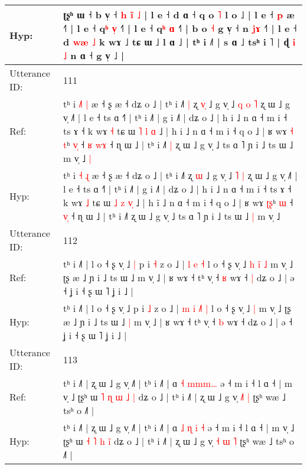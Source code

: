 \documentclass[10pt]{article}
\DeclareRobustCommand{\hl}[1]{{\textcolor{red}{#1}}}
\begin{document}
\begin{longtable}{ll}
 \\
Hyp: & ʈʂʰ ɯ ˧ b v̩ ˧\hl{ }\hl{h} \hl{i}\hl{̃} \hl{˩} | l e ˧ d ɑ ˧\hl{}\hl{}\hl{} q o \hl{˥} l o ˩ | l e ˧ \hl{p} \hl{}æ ˧˥ | l e ˧ q\hl{ʰ} \hl{v}\hl{̩} ˧˥ | l e ˧ q\hl{ʰ}\hl{ }\hl{ɑ} ˧˥ | b o \hl{˧} g v̩ ˧ n \hl{j}\hl{ɤ} ˧˥ | l e ˧ d\hl{}\hl{} \hl{w}\hl{æ} \hl{˩} k wɤ ˩ tɕ ɯ ˩ l ɑ ˩ | tʰ i ˩˥ | s ɑ ˩ tsʰ i \hl{}˥ | ɖ \hl{i} \hl{˩} n ɑ ˧ g v̩ ˩ |
 \\
\midrule
Utterance ID: & 111 \\
Ref: & tʰ i \hl{˩}\hl{˥} \hl{|} æ ˧ ʂ æ ˧ dʑ o ˩ | tʰ i ˩˥\hl{ }\hl{|} ʐ \hl{v}\hl{̩} ˩ g v̩ ˩\hl{ }\hl{q} \hl{o} \hl{˥} ʐ ɯ ˩ g v̩ ˩˥ | l e ˧ ts ɑ ˧˥ | tʰ i ˩˥ | g i ˩˥ | dʑ o ˩ | h i ˩ n ɑ ˧ m i ˧ ts ɤ ˧ k wɤ \hl{˧} tɕ ɯ \hl{˥} \hl{l} \hl{}\hl{ɑ} ˩ | h i\hl{} ˩ n ɑ ˧ m i ˧ q o ˩ | ʁ wɤ \hl{˧}\hl{ }\hl{t}ʰ \hl{v}\hl{̩} ˧\hl{ }\hl{ʁ} \hl{w}\hl{ɤ} ˧ ɳ ɯ ˩ | tʰ i ˩˥\hl{ }\hl{|} ʐ ɯ ˩ g v̩ ˩ ts ɑ ˥ ɲ i ˩ ts ɯ ˩\hl{}\hl{} m v̩ ˩\hl{ }\hl{|}
 \\
Hyp: & tʰ i \hl{}\hl{˧} \hl{ɻ} æ ˧ ʂ æ ˧ dʑ o ˩ | tʰ i ˩˥\hl{}\hl{} ʐ \hl{}\hl{ɯ} ˩ g v̩ ˩\hl{}\hl{} \hl{˥} \hl{|} ʐ ɯ ˩ g v̩ ˩˥ | l e ˧ ts ɑ ˧˥ | tʰ i ˩˥ | g i ˩˥ | dʑ o ˩ | h i ˩ n ɑ ˧ m i ˧ ts ɤ ˧ k wɤ \hl{˩} tɕ ɯ \hl{˩} \hl{z} \hl{v}\hl{̩} ˩ | h i\hl{̃} ˩ n ɑ ˧ m i ˧ q o ˩ | ʁ wɤ \hl{}\hl{ʈ}\hl{ʂ}ʰ \hl{}\hl{ɯ} ˧\hl{}\hl{} \hl{v}\hl{̩} ˧ ɳ ɯ ˩ | tʰ i ˩˥\hl{}\hl{} ʐ ɯ ˩ g v̩ ˩ ts ɑ ˥ ɲ i ˩ ts ɯ ˩\hl{ }\hl{|} m v̩ ˩\hl{}\hl{}
 \\
\midrule
Utterance ID: & 112 \\
Ref: & tʰ i ˩˥ | l o ˧ ʂ v̩ ˩\hl{ }\hl{|} p i \hl{˧} z o ˩ |\hl{}\hl{} \hl{l} \hl{}\hl{e} \hl{˧} l o ˧ ʂ v̩ ˩\hl{ }\hl{h}\hl{ }\hl{i}\hl{̃} \hl{˩} m v̩ ˩ ʈʂ æ ˩ ɲ i ˩ ts ɯ ˩\hl{}\hl{} m v̩ ˩ | ʁ wɤ ˧ tʰ v̩ ˧ \hl{ʁ} wɤ ˧\hl{ }\hl{|} dʑ o ˩ | ə ˧ ʝ i ˧ ʂ ɯ ˥ ʝ i ˩ |
 \\
Hyp: & tʰ i ˩˥ | l o ˧ ʂ v̩ ˩\hl{}\hl{} p i \hl{˩} z o ˩ |\hl{ }\hl{m} \hl{i} \hl{˩}\hl{˥} \hl{|} l o ˧ ʂ v̩ ˩\hl{}\hl{}\hl{}\hl{}\hl{} \hl{|} m v̩ ˩ ʈʂ æ ˩ ɲ i ˩ ts ɯ ˩\hl{ }\hl{|} m v̩ ˩ | ʁ wɤ ˧ tʰ v̩ ˧ \hl{b} wɤ ˧\hl{}\hl{} dʑ o ˩ | ə ˧ ʝ i ˧ ʂ ɯ ˥ ʝ i ˩ |
 \\
\midrule
Utterance ID: & 113 \\
Ref: & tʰ i ˩˥ | ʐ ɯ ˩ g v̩ ˩˥ | tʰ i ˩˥ | ɑ \hl{˧} \hl{}\hl{m}\hl{m}\hl{m}\hl{…} ə ˧ m i ˧ l ɑ ˧ | m v̩ ˩ ʈʂʰ ɯ \hl{˥} \hl{ɳ} \hl{ɯ} \hl{˩}\hl{ }\hl{|} dʑ o ˩ | tʰ i ˩˥ | ʐ ɯ ˩ g v̩ \hl{}\hl{˩}\hl{˥} \hl{|} ʈʂʰ wæ ˩ tsʰ o ˩˥ |
 \\
Hyp: & tʰ i ˩˥ | ʐ ɯ ˩ g v̩ ˩˥ | tʰ i ˩˥ | ɑ \hl{˩} \hl{ɳ}\hl{ }\hl{i}\hl{ }\hl{˧} ə ˧ m i ˧ l ɑ ˧ | m v̩ ˩ ʈʂʰ ɯ \hl{˧} \hl{˥} \hl{h} \hl{}\hl{i}\hl{̃} dʑ o ˩ | tʰ i ˩˥ | ʐ ɯ ˩ g v̩ \hl{˧}\hl{ }\hl{ɯ} \hl{˥} ʈʂʰ wæ ˩ tsʰ o ˩˥ |

\end{longtable}
\end{document}
